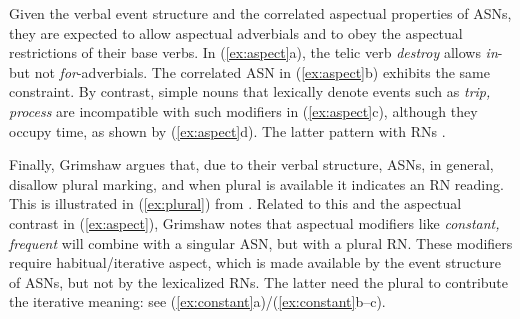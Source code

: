 \documentclass[output=paper]{langsci/langscibook}
\begin{document}
\begin{exe}
\end{exe}

 {Given the verbal event structure and the correlated aspectual properties of ASNs, they are expected to allow aspectual adverbials and to obey the aspectual restrictions of their base verbs. In (\ref{ex:aspect}a), the telic verb \textit{destroy} allows \textit{in}- but not \textit{for}-adverbials. The correlated ASN in (\ref{ex:aspect}b) exhibits the same constraint. By contrast,  simple nouns that lexically denote events such as \textit{trip, process} are incompatible with such modifiers in (\ref{ex:aspect}c), although they occupy time, as shown by (\ref{ex:aspect}d). The latter pattern with RNs \parencite[58--59]{grimshaw:90}.}

\begin{exe}
\end{exe}

 {Finally, Grimshaw argues that, due to their verbal structure, ASNs, in general, disallow plural marking, and when plural is available it indicates an RN reading. This is illustrated in (\ref{ex:plural}) from \citet[54]{grimshaw:90}. Related to this and the aspectual contrast in (\ref{ex:aspect}), Grimshaw notes that aspectual modifiers like \textit{constant, frequent} will combine with a singular ASN, but with a plural RN. These modifiers require habitual/iterative aspect, which is made available by the event structure of ASNs, but not by the lexicalized RNs. The latter need the plural to contribute the iterative meaning: see (\ref{ex:constant}a)/(\ref{ex:constant}b--c).}
\end{document}
